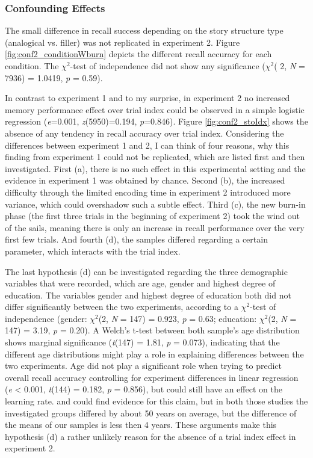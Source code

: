 \documentclass[a4paper,man,natbib,floatsintext,import]{apa6}
\begin{document}
\subsubsection{Confounding Effects}
The small difference in recall success depending on the story structure type (analogical vs. filler) was not replicated in experiment 2. Figure \ref{fig:conf2_conditionWburn} depicts the different recall accuracy for each condition. The ${\chi}^2$-test of independence did not show any significance (\textit{${\chi}^2$}( 2, \textit{N} = 7936) = 1.0419, \textit{p} = 0.59).

In contrast to experiment 1 and to my surprise, in experiment 2 no increased memory performance effect over trial index could be observed in a simple logistic regression (\textit{e}=0.001, \textit{z}(5950)=0.194, \textit{p}=0.846). Figure \ref{fig:conf2_stoIdx} shows the absence of any tendency in recall accuracy over trial index. Considering the differences between experiment 1 and 2, I can think of four reasons, why this finding from experiment 1 could not be replicated, which are listed first and then investigated.
First (a), there is no such effect in this experimental setting and the evidence in experiment 1 was obtained by chance. Second (b), the increased difficulty through the limited encoding time in experiment 2 introduced more variance, which could overshadow such a subtle effect. Third (c), the new burn-in phase (the first three trials in the beginning of experiment 2) took the wind out of the sails, meaning there is only an increase in recall performance over the very first few trials. And fourth (d), the samples differed regarding a certain parameter, which interacts with the trial index.

The last hypothesis (d) can be investigated regarding the three demographic variables that were recorded, which are age, gender and highest degree of education. The variables gender and highest degree of education both did not differ significantly between the two experiments, according to a ${\chi}^2$-test of independence (gender: \textit{${\chi}^2$}(2, \textit{N} = 147) = 0.923, \textit{p} = 0.63; education: \textit{${\chi}^2$}(2, \textit{N} = 147) = 3.19, \textit{p} = 0.20). A Welch's t-test between both sample's age distribution shows marginal significance (\textit{t}(147) = 1.81, \textit{p} = 0.073), indicating that the different age distributions might play a role in explaining differences between the two experiments. Age did not play a significant role when trying to predict overall recall accuracy controlling for experiment differences in linear regression (\textit{e} < 0.001, \textit{t}(144) = 0.182, \textit{p} = 0.856), but could still have an effect on the learning rate. \cite{Gagnon2005} and \cite{Turcotte2005} could find evidence for this claim, but in both those studies the investigated groups differed by about 50 years on average, but the difference of the means of our samples is less then 4 years. These arguments make this hypothesis (d) a rather unlikely reason for the absence of a trial index effect in experiment 2.
\end{document}
